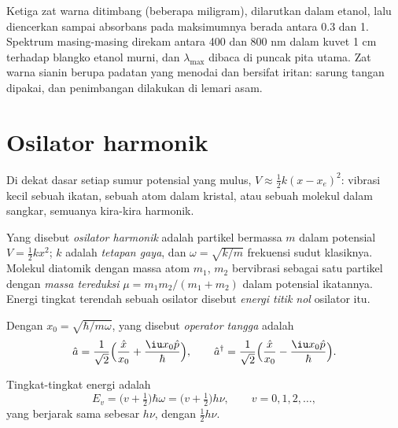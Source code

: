 \begin{inthelab}
Ketiga zat warna ditimbang (beberapa miligram), dilarutkan dalam etanol, lalu
diencerkan sampai absorbans pada maksimumnya berada antara 0.3 dan 1.
Spektrum masing-masing direkam antara 400 dan 800 nm dalam kuvet 1 cm
terhadap blangko etanol murni, dan $\lambda_{\max}$ dibaca di puncak pita
utama. Zat warna sianin berupa padatan yang menodai dan bersifat iritan:
sarung tangan dipakai, dan penimbangan dilakukan di lemari asam.
\end{inthelab}

\section{Osilator harmonik}

Di dekat dasar setiap sumur potensial yang mulus, $V \approx \frac12 k(x - x_e)^2$:
vibrasi kecil sebuah ikatan, sebuah atom dalam kristal, atau sebuah molekul
dalam sangkar, semuanya kira-kira harmonik.

\begin{definition}\label{def:b3:quantum-model-systems:oscillator}
Yang disebut \emph{osilator harmonik} adalah
partikel bermassa $m$ dalam potensial $V = \frac12 kx^2$; $k$ adalah
\emph{tetapan gaya}, dan $\omega = \sqrt{k/m}$ frekuensi
sudut klasiknya. Molekul diatomik dengan massa atom $m_1$, $m_2$ bervibrasi
sebagai satu partikel dengan \emph{massa tereduksi}
$\mu = m_1m_2/(m_1 + m_2)$ dalam potensial ikatannya. Energi tingkat terendah
sebuah osilator disebut \emph{energi titik nol}
osilator itu.
\end{definition}

\begin{definition}\label{def:b3:quantum-model-systems:ladder}
Dengan $x_0 = \sqrt{\hbar/m\omega}$, yang disebut \emph{operator
tangga} adalah
\[
\hat a = \frac{1}{\sqrt2}\Big(\frac{\hat x}{x_0} + \frac{\iu x_0\hat p}{\hbar}\Big),
\qquad \hat a^\dagger = \frac{1}{\sqrt2}\Big(\frac{\hat x}{x_0} -
\frac{\iu x_0\hat p}{\hbar}\Big).
\]
\end{definition}

\begin{theorem}\label{thm:b3:quantum-model-systems:oscillator}
Tingkat-tingkat energi  adalah
\[
E_v = \big(v + \tfrac12\big)\hbar\omega = \big(v + \tfrac12\big)h\nu, \qquad v =
0, 1, 2, \dots,
\]
yang berjarak sama sebesar $h\nu$, dengan  $\frac12h\nu$.
\end{theorem}

